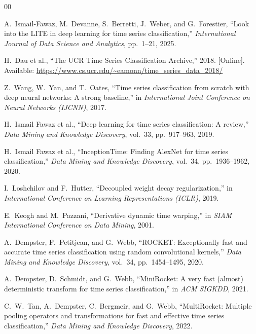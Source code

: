 \documentclass[conference]{IEEEtran}
\begin{document}
\begin{thebibliography}{00}

 A.~Ismail-Fawaz, M.~Devanne, S.~Berretti, J.~Weber, and G.~Forestier, ``Look into the LITE in deep learning for time series classification,'' \textit{International Journal of Data Science and Analytics}, pp.~1--21, 2025.

 H.~Dau et al., ``The UCR Time Series Classification Archive,'' 2018. [Online]. Available: \url{https://www.cs.ucr.edu/~eamonn/time_series_data_2018/}

 Z.~Wang, W.~Yan, and T.~Oates, ``Time series classification from scratch with deep neural networks: A strong baseline,'' in \textit{International Joint Conference on Neural Networks (IJCNN)}, 2017.

 H.~Ismail Fawaz et al., ``Deep learning for time series classification: A review,'' \textit{Data Mining and Knowledge Discovery}, vol.~33, pp.~917--963, 2019.

 H.~Ismail Fawaz et al., ``InceptionTime: Finding AlexNet for time series classification,'' \textit{Data Mining and Knowledge Discovery}, vol.~34, pp.~1936--1962, 2020.

 I.~Loshchilov and F.~Hutter, ``Decoupled weight decay regularization,'' in \textit{International Conference on Learning Representations (ICLR)}, 2019.

 E.~Keogh and M.~Pazzani, ``Derivative dynamic time warping,'' in \textit{SIAM International Conference on Data Mining}, 2001.

 A.~Dempster, F.~Petitjean, and G.~Webb, ``ROCKET: Exceptionally fast and accurate time series classification using random convolutional kernels,'' \textit{Data Mining and Knowledge Discovery}, vol.~34, pp.~1454--1495, 2020.

 A.~Dempster, D.~Schmidt, and G.~Webb, ``MiniRocket: A very fast (almost) deterministic transform for time series classification,'' in \textit{ACM SIGKDD}, 2021.

 C.~W.~Tan, A.~Dempster, C.~Bergmeir, and G.~Webb, ``MultiRocket: Multiple pooling operators and transformations for fast and effective time series classification,'' \textit{Data Mining and Knowledge Discovery}, 2022.


\end{thebibliography}
\end{document}
